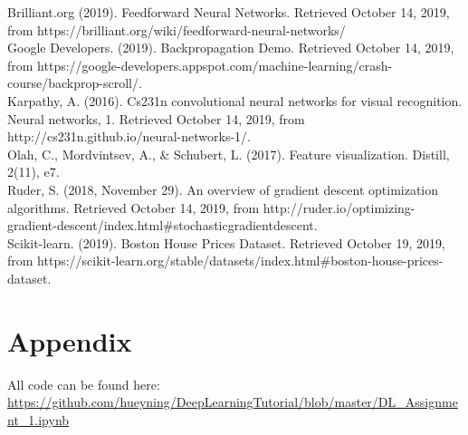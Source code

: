 \documentclass[11pt]{article}
\begin{document}
    Brilliant.org (2019). Feedforward Neural Networks. Retrieved October 14,
2019, from https://brilliant.org/wiki/feedforward-neural-networks/\\

Google Developers. (2019). Backpropagation Demo. Retrieved October 14,
2019, from
https://google-developers.appspot.com/machine-learning/crash-course/backprop-scroll/.\\

Karpathy, A. (2016). Cs231n convolutional neural networks for visual
recognition. Neural networks, 1. Retrieved October 14, 2019, from
http://cs231n.github.io/neural-networks-1/.\\

Olah, C., Mordvintsev, A., \& Schubert, L. (2017). Feature
visualization. Distill, 2(11), e7.\\

Ruder, S. (2018, November 29). An overview of gradient descent
optimization algorithms. Retrieved October 14, 2019, from
http://ruder.io/optimizing-gradient-descent/index.html\#stochasticgradientdescent.\\

Scikit-learn. (2019). Boston House Prices Dataset. Retrieved October 19,
2019, from
https://scikit-learn.org/stable/datasets/index.html\#boston-house-prices-dataset.

\section{Appendix}

All code can be found here: \url{https://github.com/hueyning/DeepLearningTutorial/blob/master/DL_Assignment_1.ipynb}

    
    
    
    
\end{document}
